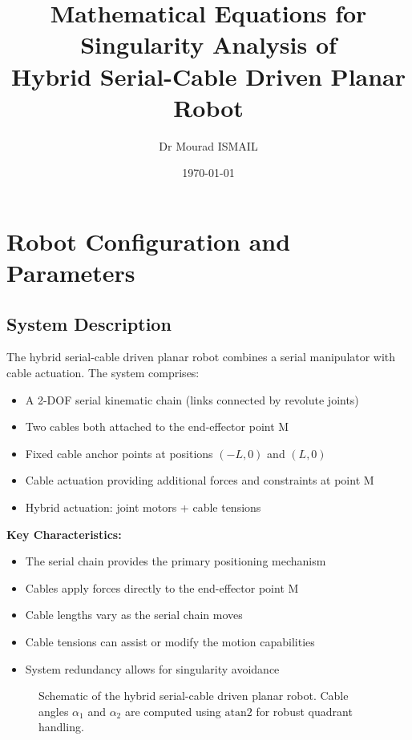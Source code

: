 \documentclass[11pt,a4paper]{article}
\title{Mathematical Equations for Singularity Analysis of \\
Hybrid Serial-Cable Driven Planar Robot}
\author{Dr Mourad ISMAIL}
\date{\today}
\begin{document}
\maketitle

\tableofcontents
\newpage

\section{Robot Configuration and Parameters}

\subsection{System Description}
The hybrid serial-cable driven planar robot combines a serial manipulator with cable actuation. The system comprises:

\begin{itemize}
    \item A 2-DOF serial kinematic chain (links connected by revolute joints)
    \item Two cables both attached to the end-effector point M
    \item Fixed cable anchor points at positions $(-L, 0)$ and $(L, 0)$
    \item Cable actuation providing additional forces and constraints at point M
    \item Hybrid actuation: joint motors + cable tensions
\end{itemize}

\textbf{Key Characteristics:}
\begin{itemize}
    \item The serial chain provides the primary positioning mechanism
    \item Cables apply forces directly to the end-effector point M
    \item Cable lengths vary as the serial chain moves
    \item Cable tensions can assist or modify the motion capabilities
    \item System redundancy allows for singularity avoidance
\end{itemize}

\begin{figure}[h]
\centering

\caption{Schematic of the hybrid serial-cable driven planar robot. Cable angles $\alpha_1$ and $\alpha_2$ are computed using $\text{atan2}$ for robust quadrant handling.}
\label{fig:robot_config}
\end{figure}
\end{document}
